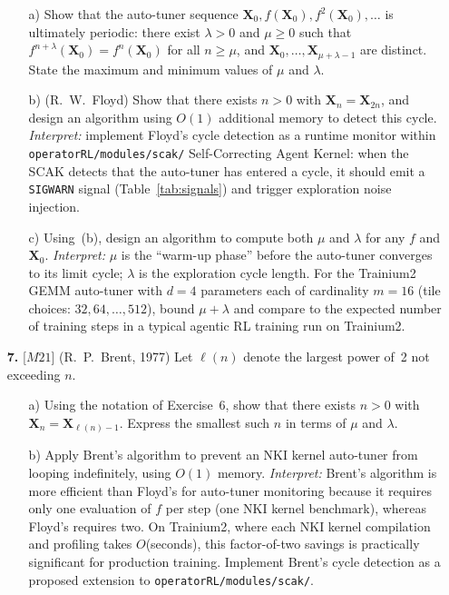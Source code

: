 \documentclass[12pt]{article}
\begin{document}
\begin{enumerate}
\begin{enumerate}
\item[a)] Show that the auto-tuner sequence $\mathbf{X}_0, f(\mathbf{X}_0), f^2(\mathbf{X}_0), \ldots$ is ultimately periodic: there exist $\lambda > 0$ and $\mu \geq 0$ such that $f^{n+\lambda}(\mathbf{X}_0) = f^n(\mathbf{X}_0)$ for all $n \geq \mu$, and $\mathbf{X}_0, \ldots, \mathbf{X}_{\mu+\lambda-1}$ are distinct. State the maximum and minimum values of $\mu$ and $\lambda$.
\item[b)] (R.~W.~Floyd) Show that there exists $n > 0$ with $\mathbf{X}_n = \mathbf{X}_{2n}$, and design an algorithm using $O(1)$ additional memory to detect this cycle. \emph{Interpret:} implement Floyd's cycle detection as a runtime monitor within \texttt{operatorRL/modules/scak/} Self-Correcting Agent Kernel: when the SCAK detects that the auto-tuner has entered a cycle, it should emit a \texttt{SIGWARN} signal (Table~\ref{tab:signals}) and trigger exploration noise injection.
\item[c)] Using~(b), design an algorithm to compute both $\mu$ and $\lambda$ for any $f$ and $\mathbf{X}_0$. \emph{Interpret:} $\mu$ is the ``warm-up phase'' before the auto-tuner converges to its limit cycle; $\lambda$ is the exploration cycle length. For the Trainium2 GEMM auto-tuner with $d = 4$ parameters each of cardinality $m = 16$ (tile choices: $32, 64, \ldots, 512$), bound $\mu + \lambda$ and compare to the expected number of training steps in a typical agentic RL training run on Trainium2.
\end{enumerate}

\item[\textbf{7.}] [$M21$] (R.~P.~Brent, 1977) Let $\ell(n)$ denote the largest power of~2 not exceeding $n$.

\begin{enumerate}
\item[a)] Using the notation of Exercise~6, show that there exists $n > 0$ with $\mathbf{X}_n = \mathbf{X}_{\ell(n)-1}$. Express the smallest such $n$ in terms of $\mu$ and $\lambda$.
\item[b)] Apply Brent's algorithm to prevent an NKI kernel auto-tuner from looping indefinitely, using $O(1)$ memory. \emph{Interpret:} Brent's algorithm is more efficient than Floyd's for auto-tuner monitoring because it requires only one evaluation of $f$ per step (one NKI kernel benchmark), whereas Floyd's requires two. On Trainium2, where each NKI kernel compilation and profiling takes $O$(seconds), this factor-of-two savings is practically significant for production training. Implement Brent's cycle detection as a proposed extension to \texttt{operatorRL/modules/scak/}.
\end{enumerate}


\end{enumerate}
\end{document}
